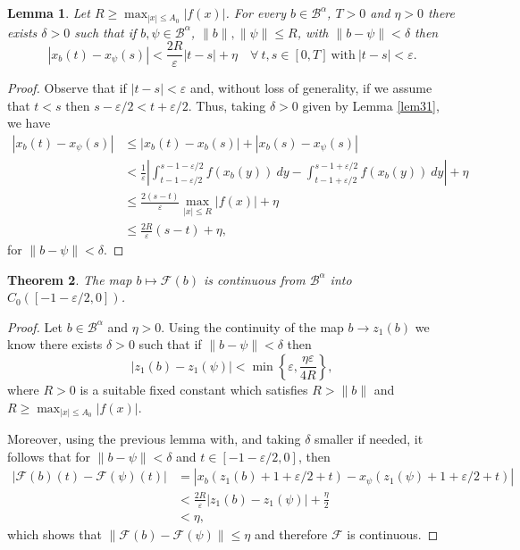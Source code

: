 \documentclass[a4paper,11pt]{article}
\theoremstyle{plain}
\newtheorem{thm}{Theorem}[section]
\newtheorem{lem}[thm]{Lemma}
\theoremstyle{definition}
\theoremstyle{definition}
\newcommand{\B}{\mathcal{B}}
\newcommand{\Fcal}{\mathcal{F}}
\numberwithin{equation}{section}
\begin{document}
\begin{lem}\label{lem21}
    Let $R\geq \max_{|x|\leq A_0} |f(x)|$. For every  $b\in \B^\alpha$, $T>0$ and $\eta>0$ there exists $\delta>0$ such that if $b,\psi\in \B^\alpha$, $\|b\|,\|\psi\|\leq R$, with $\|b-\psi\| < \delta$ then
    \[
        |x_b(t) - x_\psi(s)| < \frac{2 R}{\varepsilon}|t-s| + \eta \quad\forall~t,s\in[0,T]~\text{with}~ |t-s|<\varepsilon.
    \]
\end{lem}
\begin{proof}
Observe that if $|t-s|<\varepsilon$ and, without loss of generality, if we assume that $t<s$ then $s-\varepsilon/2<t+\varepsilon/2$. Thus, taking $\delta>0$ given by Lemma \ref{lem31}, we have
\begin{align*}
    |x_b(t)-x_\psi(s)| &\leq |x_b(t) - x_b(s)| + |x_b(s) - x_\psi(s)| \\
    & < \frac{1}{\varepsilon} \left| \int_{t-1-\varepsilon/2}^{s-1-\varepsilon/2} f(x_b(y))~dy - \int_{t-1+\varepsilon/2}^{s-1+\varepsilon/2} f(x_b(y))~dy \right| +\eta \\
    & \leq \frac{2(s-t)}{\varepsilon} \max_{|x|\leq R}|f(x)| + \eta \\
    &\leq \frac{2R}{\varepsilon}(s-t) + \eta,
\end{align*}
for $\|b-\psi\|< \delta$.
\end{proof}

\begin{thm}
    The map $b\mapsto \Fcal (b)$ is continuous from $\B^{\alpha}$ into $C_0([-1-\varepsilon/2,0])$.
\end{thm}
\begin{proof}
Let $b\in\B^{\alpha}$ and $\eta>0$. Using the continuity of the map $b\to z_1(b)$ we know there exists $\delta>0$ such that if $\|b-\psi\|<\delta$ then
\[
|z_1(b)- z_1(\psi)|<\min \left\{ \varepsilon, \frac{\eta\varepsilon}{4R} \right\},
\]
where $R>0$ is a suitable fixed constant which satisfies $R> \|b\|$ and $R\geq \max_{|x|\leq A_0} |f(x)|$.

Moreover, using the previous lemma with, and taking $\delta$ smaller if needed, it follows that for $\|b - \psi\|<\delta$ and $t\in[-1-\varepsilon/2,0]$, then
\begin{align*}
    |\Fcal(b)(t) - \Fcal(\psi)(t)| & = |x_b(z_1(b)+1+\varepsilon/2 +t) - x_\psi(z_1(\psi) + 1 +\varepsilon/2 + t)| \\
    &< \frac{2R}{\varepsilon}|z_1(b) - z_1(\psi)| + \frac{\eta}{2} \\
    &< \eta,
\end{align*}
which shows that $\|\Fcal(b) - \Fcal(\psi)\| \leq\eta$ and therefore $\Fcal$ is continuous.
\end{proof}
\end{document}
